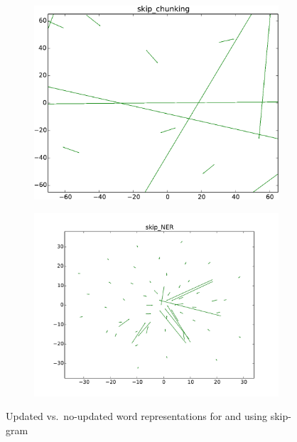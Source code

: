 \begin{figure}
\centering
\begin{subfigure}[b]{0.48\textwidth}
	\centering
    \includegraphics[width=\textwidth]{plots/vectorField/Lizhen/scaled/Lizhen_skip_chunking}
	\subcaption{\chunking}	
	\label{fig:skipChu}
\end{subfigure}
\begin{subfigure}[b]{0.48\textwidth}
	\centering
    \includegraphics[width=\textwidth]{plots/vectorField/Lizhen/Lizhen_skip_NER}    	
	\subcaption{\ner}
	\label{fig:skippos}	
\end{subfigure}
\caption{Updated vs.\ no-updated word representations for \pos and \chunking using skip-gram}
\label{fig:vectorfield}
\end{figure}

